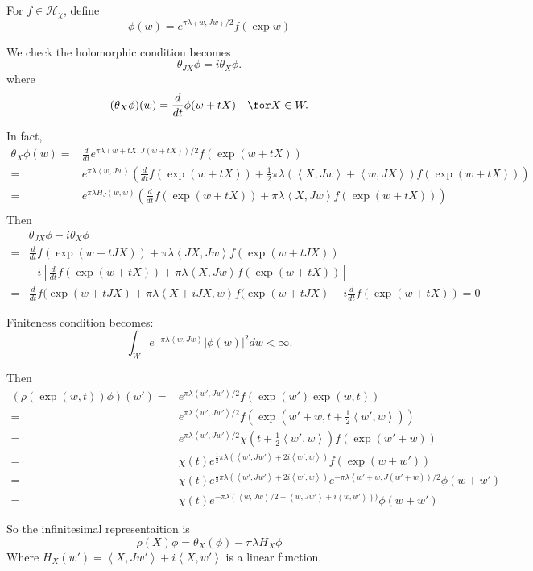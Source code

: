 \documentclass[12pt]{amsart}
\def\inn#1#2{\left\langle{#1},{#2}\right\rangle}
\def\abs#1{\left|{#1}\right|}
\def\chh{\mathcal{H}}
\def\ddt{\frac{d}{dt}}
\begin{document}
For $f\in \chh_\chi$, define
\[
\phi(w) = e^{\pi \lambda \inn{w}{Jw}/2} f(\exp w) 
\] 

We check the holomorphic condition becomes 
\[
\theta_{JX} \phi = i \theta_{X} \phi.
\]
where 
\[
(\theta_X \phi)(w) = \frac{d}{dt}\phi(w+tX) \quad \for X\in W.
\]

In fact, 
\[
\begin{split}
\theta_X \phi(w) =& \ddt e^{\pi \lambda \inn{w+tX}{J(w+tX)}/2} f(\exp(w+tX))\\
= &  e^{\pi \lambda \inn{w}{Jw}}(\ddt f(\exp(w+tX)) 
+ \frac{1}{2}\pi\lambda (\inn{X}{Jw}+\inn{w}{JX}) f(\exp(w+tX))) \\
= &  e^{\pi \lambda H_J(w,w)}(\ddt f(\exp(w+tX)) + \pi\lambda \inn{X}{Jw} f(\exp(w+tX))) \\
\end{split}
\] 
Then 
\[
\begin{split}
&\theta_{JX}\phi - i\theta_{X}\phi \\
= & \ddt f(\exp(w+tJX)) + \pi\lambda \inn{JX}{Jw} f(\exp(w+tJX))\\
&-i \left[ \ddt f(\exp(w+tX)) + \pi\lambda \inn{X}{Jw} f(\exp(w+tX))\right]\\
=& \ddt f(\exp(w+tJX)  + \pi \lambda \inn{X+iJX}{w} f(\exp(w+tJX)
- i \ddt f(\exp(w+tX))= 0 
\end{split}
\]

Finiteness condition becomes:
\[
\int_W e^{-\pi \lambda \inn{w}{Jw}}\abs{\phi(w)}^2dw < \infty.
\]

Then
\[
\begin{split}
(\rho(\exp(w,t))\phi)(w') =& e^{\pi \lambda \inn{w'}{Jw'}/2} f(\exp(w') \exp(w,t))\\
=& e^{\pi \lambda \inn{w'}{Jw'}/2} f(\exp(w'+w,t+ \frac{1}{2}\inn{w'}{w}))\\
=& e^{\pi \lambda \inn{w'}{Jw'}/2} \chi(t+ \frac{1}{2}\inn{w'}{w}) f(\exp(w'+w))\\
=& \chi(t) e^{\frac{1}{2}\pi \lambda (\inn{w'}{Jw'}+2i \inn{w'}{w})}
 f(\exp(w+w')) \\
=& \chi(t) e^{\frac{1}{2}\pi \lambda (\inn{w'}{Jw'}+2i \inn{w'}{w})} 
e^{-\pi \lambda \inn{w'+w}{J(w'+w)}/2} \phi(w+w')\\
=& \chi(t) e^{-\pi \lambda (\inn{w}{Jw}/2+ \inn{w}{Jw'}+i\inn{w}{w'}))} 
 \phi(w+w') 
\end{split}
\]


So the infinitesimal representaition is 
\[
\rho(X) \phi = \theta_X(\phi) -\pi\lambda H_X \phi
\]
Where $H_X(w') =\inn{X}{Jw'} + i\inn{X}{w'}$ is a linear function.
\end{document}
